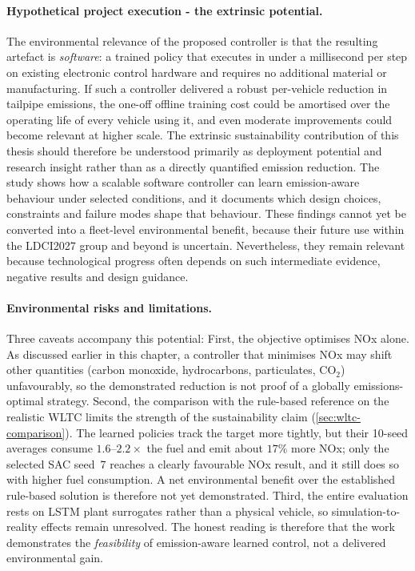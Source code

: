 \paragraph{Hypothetical project execution - the extrinsic potential.} The environmental relevance of the proposed controller is that the resulting artefact is \emph{software}: a trained policy that executes in under a millisecond per step on existing electronic control hardware and requires no additional material or manufacturing. If such a controller delivered a robust per-vehicle reduction in tailpipe emissions, the one-off offline training cost could be amortised over the operating life of every vehicle using it, and even moderate improvements could become relevant at higher scale. The extrinsic sustainability contribution of this thesis should therefore be understood primarily as deployment potential and research insight rather than as a directly quantified emission reduction. The study shows how a scalable software controller can learn emission-aware behaviour under selected conditions, and it documents which design choices, constraints and failure modes shape that behaviour. These findings cannot yet be converted into a fleet-level environmental benefit, because their future use within the \ac{LDCI2027} group and beyond is uncertain. Nevertheless, they remain relevant because technological progress often depends on such intermediate evidence, negative results and design guidance.

\paragraph{Environmental risks and limitations.} Three caveats accompany this potential: First, the objective optimises \ac{NOx} alone. As discussed earlier in this chapter, a controller that minimises \ac{NOx} may shift other quantities (carbon monoxide, hydrocarbons, particulates, $\mathrm{CO}_2$) unfavourably, so the demonstrated reduction is not proof of a globally emissions-optimal strategy. Second, the comparison with the rule-based reference on the realistic \ac{WLTC} limits the strength of the sustainability claim (\autoref{sec:wltc-comparison}). The learned policies track the target more tightly, but their 10-seed averages consume $1.6$--$2.2\times$ the fuel and emit about $17\%$ more \ac{NOx}; only the selected SAC seed~7 reaches a clearly favourable \ac{NOx} result, and it still does so with higher fuel consumption. A net environmental benefit over the established rule-based solution is therefore not yet demonstrated. Third, the entire evaluation rests on \ac{LSTM} plant surrogates rather than a physical vehicle, so simulation-to-reality effects remain unresolved. The honest reading is therefore that the work demonstrates the \emph{feasibility} of emission-aware learned control, not a delivered environmental gain.


